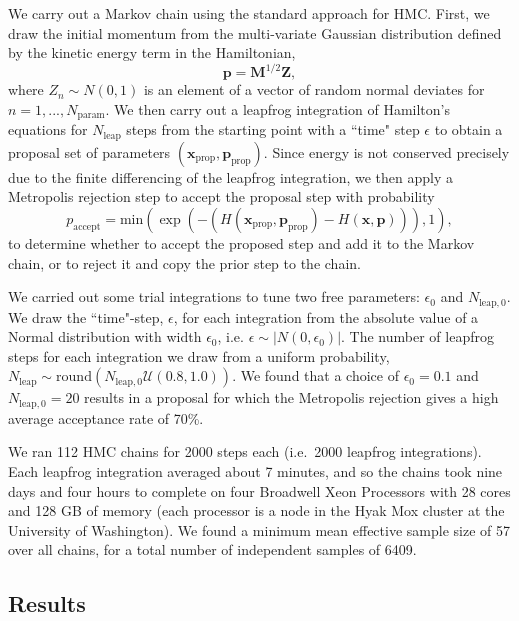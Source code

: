 \documentclass[twocolumn]{aastex63}
\begin{document}
We carry out a Markov chain using the standard approach for HMC. First, we draw the initial momentum from the multi-variate Gaussian distribution defined by the kinetic energy term in the Hamiltonian,
\begin{equation}
    \mathbf{p} = \mathbf{M}^{1/2} \mathbf{Z},
\end{equation}
where $Z_n \sim N(0,1)$ is an element of a vector of random normal deviates for $n=1,...,N_\mathrm{param}$.
We then carry out a leapfrog integration of Hamilton's equations for $N_\mathrm{leap}$ steps from the starting point with a ``time" step $\epsilon$ to obtain a proposal set of parameters $(\mathbf{x}_\mathrm{prop},\mathbf{p}_\mathrm{prop})$.  Since energy is not conserved precisely due to the finite differencing of the leapfrog integration, we then apply a Metropolis rejection step to accept the proposal step with probability
\begin{equation}
    p_\mathrm{accept} = \mathrm{min}(\exp(-(H(\mathbf{x}_\mathrm{prop},\mathbf{p}_\mathrm{prop}) - H(\mathbf{x},\mathbf{p}))),1),
\end{equation}
to determine whether to accept the proposed step and add it to the Markov chain, or to reject it and copy the prior step to the chain.

We carried out some trial integrations to tune two free parameters:  $\epsilon_0$ and $N_{\mathrm{leap},0}$.  We draw the ``time"-step, $\epsilon$, for each integration from the absolute value of a Normal distribution with width $\epsilon_0$, i.e. $\epsilon \sim \vert N(0,\epsilon_0) \vert$.
The number of leapfrog steps for each integration we draw from a uniform probability,
$N_\mathrm{leap} \sim \mathrm{round}(N_{\mathrm{leap},0} \mathcal{U}(0.8,1.0))$.  We found that a choice of $\epsilon_0 = 0.1$
and $N_{\mathrm{leap},0} = 20$ results in a proposal for which the Metropolis rejection gives a high average acceptance rate of 70\%.  

We ran 112 HMC chains for 2000 steps each (i.e.\ 2000 leapfrog integrations).   Each leapfrog integration averaged about 7 minutes, and so the chains took nine
days and four hours to complete on four Broadwell Xeon Processors with 28 cores and  128 GB of memory (each processor is a node in the Hyak Mox cluster at the University of Washington).
We found a minimum mean effective sample size of 57 over all chains, for a 
total number of independent samples of 6409.

\subsection{Results}
\end{document}
